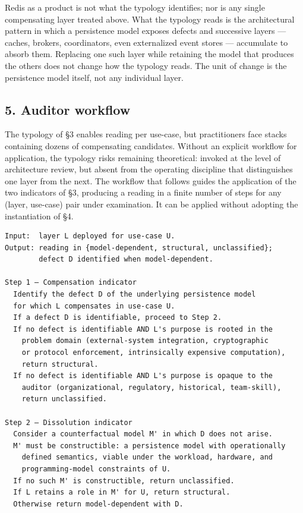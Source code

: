 \documentclass[
]{article}
\begin{document}
Redis as a product is not what the typology identifies; nor is any
single compensating layer treated above. What the typology reads is the
architectural pattern in which a persistence model exposes defects and
successive layers --- caches, brokers, coordinators, even externalized
event stores --- accumulate to absorb them. Replacing one such layer
while retaining the model that produces the others does not change how
the typology reads. The unit of change is the persistence model itself,
not any individual layer.

\subsection{5. Auditor workflow}\label{auditor-workflow}

The typology of §3 enables reading per use-case, but practitioners face
stacks containing dozens of compensating candidates. Without an explicit
workflow for application, the typology risks remaining theoretical:
invoked at the level of architecture review, but absent from the
operating discipline that distinguishes one layer from the next. The
workflow that follows guides the application of the two indicators of
§3, producing a reading in a finite number of steps for any (layer,
use-case) pair under examination. It can be applied without adopting the
instantiation of §4.

\begin{verbatim}
Input:  layer L deployed for use-case U.
Output: reading in {model-dependent, structural, unclassified};
        defect D identified when model-dependent.

Step 1 — Compensation indicator
  Identify the defect D of the underlying persistence model
  for which L compensates in use-case U.
  If a defect D is identifiable, proceed to Step 2.
  If no defect is identifiable AND L's purpose is rooted in the
    problem domain (external-system integration, cryptographic
    or protocol enforcement, intrinsically expensive computation),
    return structural.
  If no defect is identifiable AND L's purpose is opaque to the
    auditor (organizational, regulatory, historical, team-skill),
    return unclassified.

Step 2 — Dissolution indicator
  Consider a counterfactual model M' in which D does not arise.
  M' must be constructible: a persistence model with operationally
    defined semantics, viable under the workload, hardware, and
    programming-model constraints of U.
  If no such M' is constructible, return unclassified.
  If L retains a role in M' for U, return structural.
  Otherwise return model-dependent with D.
\end{verbatim}
\end{document}
